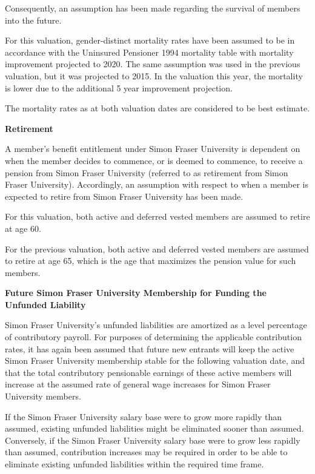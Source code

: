 \documentclass{report}
\begin{document}
\vspace{3mm}
Consequently, an assumption has been made regarding the survival of members into the future.\

\vspace{3mm}
For this valuation, gender-distinct mortality rates have been assumed to be in accordance with the Uninsured Pensioner 1994 mortality table with mortality improvement projected to 2020. The same assumption was used in the previous valuation, but it was projected to 2015. In the valuation this year, the mortality is lower due to the additional 5 year improvement projection. 

\vspace{3mm}
The mortality rates as at both valuation dates are considered to be best estimate.

\vspace{3mm}
\textbf{Retirement} 

A member's benefit entitlement under Simon Fraser University is dependent on when the member decides to commence, or is deemed to commence, to receive a pension from Simon Fraser University (referred to as retirement from Simon Fraser University). Accordingly, an assumption with respect to when a member is expected to retire from Simon Fraser University has been made.

\vspace{3mm}
For this valuation, both active and deferred vested members are assumed to retire at age 60.

\vspace{3mm}
For the previous valuation, both active and deferred vested members are assumed to retire at age 65, which is the age that maximizes the pension value for such members.

\vspace{3mm}
\textbf{Future Simon Fraser University Membership for Funding the Unfunded Liability}

Simon Fraser University's unfunded liabilities are amortized as a level percentage of contributory payroll. For purposes of determining the applicable contribution rates, it has again been assumed that future new entrants will keep the active Simon Fraser University membership stable for the following valuation date, and that the total contributory pensionable earnings of these active members will increase at the assumed rate of general wage increases for Simon Fraser University members.

\vspace{3mm}
If the Simon Fraser University salary base were to grow more rapidly than assumed, existing unfunded liabilities might be eliminated sooner than assumed. Conversely, if the Simon Fraser University salary base were to grow less rapidly than assumed, contribution increases may be required in order to be able to eliminate existing unfunded liabilities within the required time frame.
\end{document}
